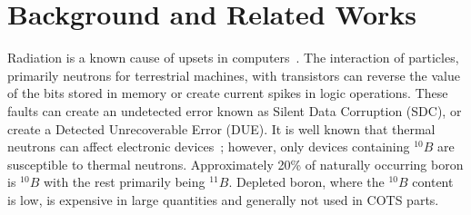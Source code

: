 \section{Background and Related Works}
\label{sec_background}

%

Radiation is a known cause of upsets in computers~\cite{Jedec2006}. The interaction of particles, primarily neutrons for terrestrial machines, with transistors can reverse the value of the bits stored in memory or create current spikes in logic operations. These faults can create an undetected error known as Silent Data Corruption (SDC), or create a Detected Unrecoverable Error (DUE). It is well known that thermal neutrons can affect electronic devices~\cite{Baumann2005, ziegler2003}; however, only devices containing $^{10}B$ are susceptible to thermal neutrons. 
Approximately 20\% of naturally occurring boron is $^{10}B$ with the rest primarily being $^{11}B$. Depleted boron, where the $^{10}B$ content is low, is expensive in large quantities and generally not used in COTS parts. %

